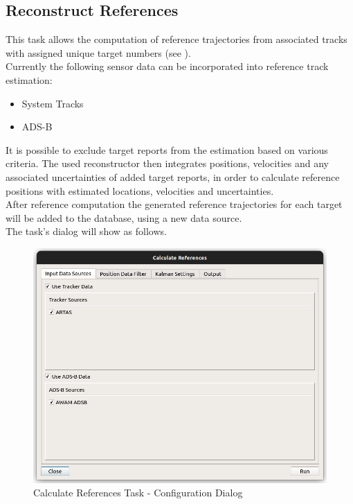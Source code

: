 
\subsection{Reconstruct References}
\label{sec:ui_proc_reconst_references}

This task allows the computation of reference trajectories from associated tracks with assigned unique target numbers (see ). \\

Currently the following sensor data can be incorporated into reference track estimation:

\begin{itemize}
    \item System Tracks
    \item ADS-B \\
\end{itemize}

It is possible to exclude target reports from the estimation based on various criteria. 
The used reconstructor then integrates positions, velocities and any associated uncertainties of 
added target reports, in order to calculate reference positions with estimated locations, velocities and uncertainties. \\

After reference computation the generated reference trajectories for each target will be added to the database, 
using a new data source. \\

The task's dialog will show as follows. \\

\begin{figure}[H]
    \center
      \includegraphics[width=14cm]{figures/ui_task_references_dialog.png}
    \caption{Calculate References Task - Configuration Dialog}
\end{figure}

